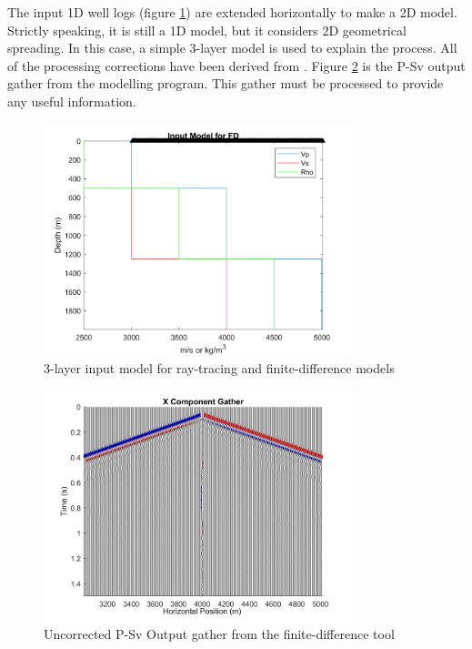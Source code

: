 \documentclass[12pt]{article}
\begin{document}
	The input 1D well logs (figure \ref{fig:3Input}) are extended horizontally to make a 2D model. Strictly speaking, it is still a 1D model, but it considers 2D geometrical spreading. In this case, a simple 3-layer model is used to explain the process. All of the processing corrections have been derived from \cite{mousa2011}. Figure \ref{fig:FD3XGather} is the P-Sv output gather from the modelling program. This gather must be processed to provide any useful information.
	
\begin{figure}[!htb]
	\centering
	\includegraphics[width=0.8\textwidth]{Figures/FD3InputModel.png}
	\caption[3-layer input test model]{3-layer input model for ray-tracing and finite-difference models}
	\label{fig:3Input}
\end{figure}

\begin{figure}[!htb]
	\centering
	\includegraphics[width=0.8\textwidth]{Figures/FD3XComponentGather.png}
	\caption[Finite-difference 3-layer output gather]{Uncorrected P-Sv Output gather from the finite-difference tool}
	\label{fig:FD3XGather}
\end{figure}
\end{document}
